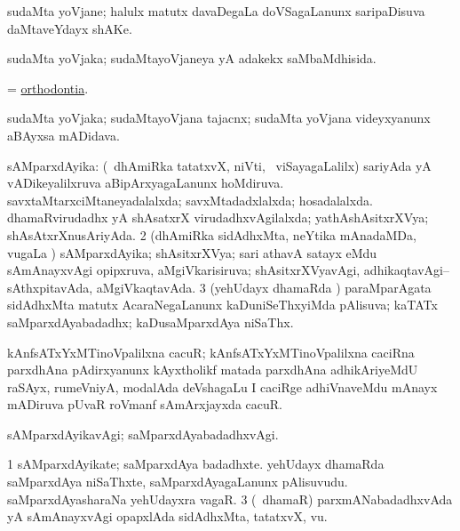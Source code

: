 \bentry
{}
\gl{\nA}
\bmng
sudaMta yoVjane; halulx matutx davaDegaLa doVSagaLanunx saripaDisuva daMtaveYdayx shAKe. 
\emng
\eentry

\bentry
{}
\gl{\gu}
\bmng
sudaMta yoVjaka; sudaMtayoVjaneya yA adakekx saMbaMdhisida. 
\emng
\eentry

\bentry
{}
\gl{\nA}
\bmng
= \hyperlink{orthodontia}{orthodontia}. 
\emng
\eentry

\bentry
{}
\gl{\nA}
\bmng
sudaMta yoVjaka; sudaMtayoVjana tajacnx; sudaMta yoVjana videyxyanunx aBAyxsa mADidava. 
\emng
\eentry

\bentry
{}
\gl{\gu}
\bmng
\bnum
{} sAMparxdAyika: 
\banum
{} (\kanmu\ dhAmiRka tatatxvX, niVti, \mo\ viSayagaLalilx) sariyAda yA vADikeyalilxruva aBipArxyagaLanunx hoMdiruva. 
 savxtaMtarxciMtaneyadalalxda; savxMtadadxlalxda; hosadalalxda. 
 dhamaRvirudadhx yA shAsatxrX virudadhxvAgilalxda; yathAshAsitxrXVya; shAsAtxrXnusAriyAda. 
\eanum
\numie
\num{2} (dhAmiRka sidAdhxMta, neYtika mAnadaMDa, \mo vugaLa \vi) sAMparxdAyika; shAsitxrXVya; sari athavA satayx eMdu sAmAnayxvAgi opipxruva, aMgiVkarisiruva; shAsitxrXVyavAgi, adhikaqtavAgi--sAthxpitavAda, aMgiVkaqtavAda. 
\num{3}  (yehUdayx dhamaRda \vi) paraMparAgata sidAdhxMta matutx AcaraNegaLanunx kaDuniSeThxyiMda pAlisuva; kaTATx saMparxdAyabadadhx; kaDusaMparxdAya niSaThx. 
\enum
\emng

\noindent
\gl{\pagu}
\bmng
  kAnfsATxYxMTinoVpalilxna cacuR; kAnfsATxYxMTinoVpalilxna caciRna parxdhAna pAdirxyanunx kAyxtholikf matada parxdhAna adhikAriyeMdU raSAyx, rumeVniyA, modalAda deVshagaLu I caciRge adhiVnaveMdu mAnayx mADiruva pUvaR roVmanf sAmArxjayxda cacuR. 
\emng
\eentry

\bentry
{}
\gl{\kirxvi}
\bmng
sAMparxdAyikavAgi; saMparxdAyabadadhxvAgi. 
\emng
\eentry

\bentry
{}
\gl{\nA}
\bmng
\bnum
\num{1} sAMparxdAyikate; saMparxdAya badadhxte. 
\banum
{} yehUdayx dhamaRda saMparxdAya niSaThxte, saMparxdAyagaLanunx pAlisuvudu. 
 saMparxdAyasharaNa yehUdayxra vagaR. 
\eanum
\numie
\num{3} (\kanmu\ dhamaR) parxmANabadadhxvAda yA sAmAnayxvAgi opapxlAda sidAdhxMta, tatatxvX, \mo vu. 
\enum
\emng
\eentry

